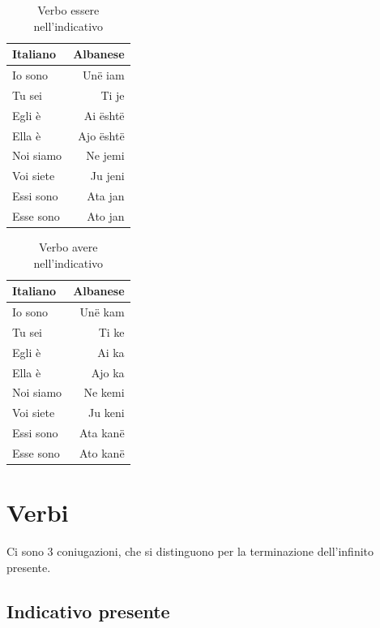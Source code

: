 \begin{table}[H]
    \centering
    \begin{tabular}{lr}
        \toprule
        Italiano    &   Albanese \\
        \midrule
        Io sono & Unë iam \\
        Tu sei & Ti je\\
        Egli è & Ai është\\
        Ella è & Ajo është\\
        Noi siamo & Ne jemi \\
        Voi siete & Ju jeni \\
        Essi sono & Ata jan \\
        Esse sono & Ato jan \\
        \bottomrule
    \end{tabular}
    \caption{Verbo essere nell'indicativo}
\end{table}

\begin{table}[H]
    \centering
    \begin{tabular}{lr}
        \toprule
        Italiano    &   Albanese \\
        \midrule
        Io sono & Unë kam \\
        Tu sei & Ti ke\\
        Egli è & Ai ka\\
        Ella è & Ajo ka\\
        Noi siamo & Ne kemi \\
        Voi siete & Ju keni \\
        Essi sono & Ata kanë \\
        Esse sono & Ato kanë \\
        \bottomrule
    \end{tabular}
    \caption{Verbo avere nell'indicativo}
\end{table}

\section{Verbi}

Ci sono 3 coniugazioni, che si distinguono per la terminazione dell'infinito presente.

\subsection{Indicativo presente}

